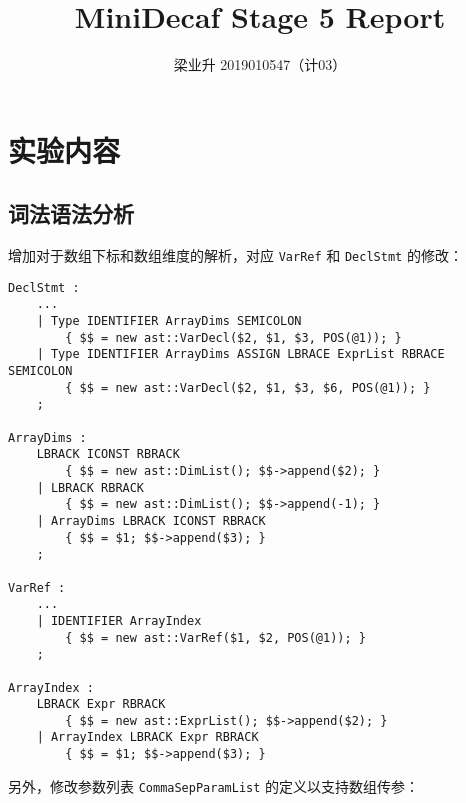 \documentclass[a4paper]{article}
\author{梁业升 2019010547（计03）}
\begin{document}


\title{MiniDecaf Stage 5 Report}

\maketitle

\section{实验内容}

\subsection{词法语法分析}

增加对于数组下标和数组维度的解析，对应 \texttt{VarRef} 和 \texttt{DeclStmt} 的修改：

\begin{lstlisting}[]
DeclStmt :
    ...
    | Type IDENTIFIER ArrayDims SEMICOLON
        { $$ = new ast::VarDecl($2, $1, $3, POS(@1)); }
    | Type IDENTIFIER ArrayDims ASSIGN LBRACE ExprList RBRACE SEMICOLON
        { $$ = new ast::VarDecl($2, $1, $3, $6, POS(@1)); }
    ;

ArrayDims :
    LBRACK ICONST RBRACK
        { $$ = new ast::DimList(); $$->append($2); }
    | LBRACK RBRACK
        { $$ = new ast::DimList(); $$->append(-1); }
    | ArrayDims LBRACK ICONST RBRACK
        { $$ = $1; $$->append($3); }
    ;

VarRef :
    ...
    | IDENTIFIER ArrayIndex
        { $$ = new ast::VarRef($1, $2, POS(@1)); }
    ;

ArrayIndex :
    LBRACK Expr RBRACK
        { $$ = new ast::ExprList(); $$->append($2); }
    | ArrayIndex LBRACK Expr RBRACK
        { $$ = $1; $$->append($3); }

\end{lstlisting}

另外，修改参数列表 \texttt{CommaSepParamList} 的定义以支持数组传参：
\end{document}
